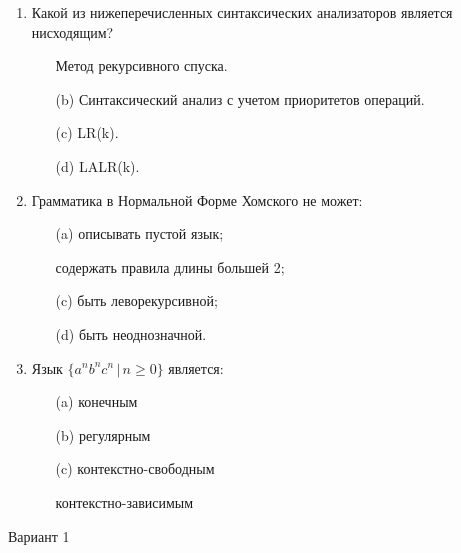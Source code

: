 \documentclass[12pt]{article}
\begin{document}
\begin{enumerate}
    \item Какой из нижеперечисленных синтаксических анализаторов является нисходящим?
    \begin{enumerate}
        \item[\Checkmark] Метод рекурсивного спуска.
        \item[(b)] Синтаксический анализ с учетом приоритетов операций.
        \item[(c)] LR(k).
        \item[(d)] LALR(k).
    \end{enumerate}
    
    \item Грамматика в Нормальной Форме Хомского не может:
    \begin{enumerate}
        \item[(a)] описывать пустой язык;
        \item[\Checkmark] содержать правила длины большей 2;
        \item[(c)] быть леворекурсивной;
        \item[(d)] быть неоднозначной.
    \end{enumerate}
    
    \item Язык $\{ a^n b^n c^n \, | \, n \geq 0 \} $ является:
    \begin{enumerate}
        \item[(a)] конечным
        \item[(b)] регулярным
        \item[(c)] контекстно-свободным 
        \item[\Checkmark] контекстно-зависимым 
    \end{enumerate}

\end{enumerate}

\pagebreak

\medskip
{\Large Вариант 1}
\medskip
\end{document}
